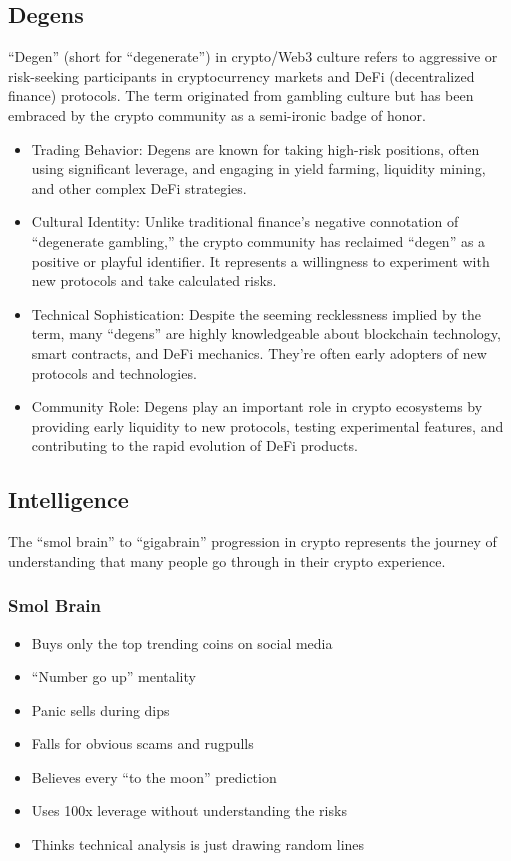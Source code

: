 \documentclass[
  letterpaper,
  DIV=11,
  numbers=noendperiod]{scrreprt}
\providecommand{\tightlist}{%
  \setlength{\itemsep}{0pt}\setlength{\parskip}{0pt}}\usepackage{longtable,booktabs,array}
\begin{document}
\subsection{Degens}\label{degens}

``Degen'' (short for ``degenerate'') in crypto/Web3 culture refers to
aggressive or risk-seeking participants in cryptocurrency markets and
DeFi (decentralized finance) protocols. The term originated from
gambling culture but has been embraced by the crypto community as a
semi-ironic badge of honor.

\begin{itemize}
\tightlist
\item
  Trading Behavior: Degens are known for taking high-risk positions,
  often using significant leverage, and engaging in yield farming,
  liquidity mining, and other complex DeFi strategies.
\item
  Cultural Identity: Unlike traditional finance's negative connotation
  of ``degenerate gambling,'' the crypto community has reclaimed
  ``degen'' as a positive or playful identifier. It represents a
  willingness to experiment with new protocols and take calculated
  risks.
\item
  Technical Sophistication: Despite the seeming recklessness implied by
  the term, many ``degens'' are highly knowledgeable about blockchain
  technology, smart contracts, and DeFi mechanics. They're often early
  adopters of new protocols and technologies.
\item
  Community Role: Degens play an important role in crypto ecosystems by
  providing early liquidity to new protocols, testing experimental
  features, and contributing to the rapid evolution of DeFi products.
\end{itemize}

\subsection{Intelligence}\label{intelligence}

The ``smol brain'' to ``gigabrain'' progression in crypto represents the
journey of understanding that many people go through in their crypto
experience.

\subsubsection{Smol Brain}\label{smol-brain}

\begin{itemize}
\tightlist
\item
  Buys only the top trending coins on social media
\item
  ``Number go up'' mentality
\item
  Panic sells during dips
\item
  Falls for obvious scams and rugpulls
\item
  Believes every ``to the moon'' prediction
\item
  Uses 100x leverage without understanding the risks
\item
  Thinks technical analysis is just drawing random lines
\end{itemize}
\end{document}
